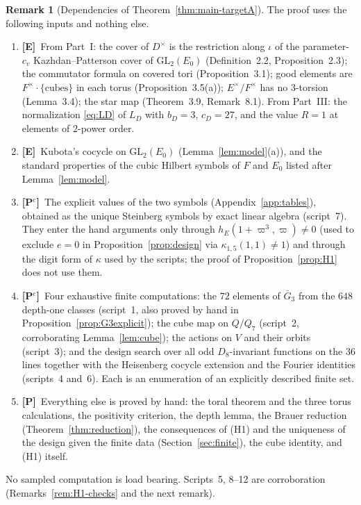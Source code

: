 \documentclass[11pt]{article}
\newcommand{\Ptag}{\textnormal{\textbf{[P]}}}
\newcommand{\Pctag}{\textnormal{\textbf{[P$^{\mathrm c}$]}}}
\newcommand{\Etag}{\textnormal{\textbf{[E]}}}
\theoremstyle{plain}
\theoremstyle{definition}
\newtheorem{remark}[theorem]{Remark}
\begin{document}
\begin{remark}[Dependencies of Theorem~\ref{thm:main-targetA}]\label{rem:dependencies}
The proof uses the following inputs and nothing else.
\begin{enumerate}[label=(D\arabic*),leftmargin=*]
\item \Etag\ From Part~I: the cover of $D^\times$ is the restriction
along $\iota$ of the parameter-$c_v$ Kazhdan--Patterson cover of
$\mathrm{GL}_2(E_0)$ (Definition~2.2, Proposition~2.3); the commutator
formula on covered tori (Proposition~3.1); good elements are
$F^\times\cdot\{\text{cubes}\}$ in each torus (Proposition~3.5(a));
$E^\times/F^\times$ has no $3$-torsion (Lemma~3.4); the star map
(Theorem~3.9, Remark~8.1).  From Part~III: the normalization
\eqref{eq:LD} of $L_D$ with $b_D=3$, $c_D=27$, and the value $R=1$ at
elements of $2$-power order.
\item \Etag\ Kubota's cocycle on $\mathrm{GL}_2(E_0)$
(Lemma~\ref{lem:model}(a)), and the standard properties of the cubic
Hilbert symbols of $F$ and $E_0$ listed after Lemma~\ref{lem:model}.
\item \Pctag\ The explicit values of the two symbols
(Appendix~\ref{app:tables}), obtained as the unique Steinberg symbols
by exact linear algebra (script~7).  They enter the hand arguments only
through $h_E(1+\varpi^3,\varpi)\ne0$ (used to exclude $e=0$ in
Proposition~\ref{prop:design} via $\kappa_{1,5}(1,1)\ne1$) and through
the digit form of $\kappa$ used by the scripts; the proof of
Proposition~\ref{prop:H1} does not use them.
\item \Pctag\ Four exhaustive finite computations: the $72$ elements of
$\bar G_3$ from the $648$ depth-one classes (script~1, also proved by
hand in Proposition~\ref{prop:G3explicit}); the cube map on $Q/Q_7$
(script~2, corroborating Lemma~\ref{lem:cube}); the actions on $V$ and
their orbits (script~3); and the design search over all odd
$D_8$-invariant functions on the $36$ lines together with the
Heisenberg cocycle extension and the Fourier identities (scripts~4
and~6).  Each is an enumeration of an explicitly described finite set.
\item \Ptag\ Everything else is proved by hand: the toral theorem and
the three torus calculations, the positivity criterion, the depth
lemma, the Brauer reduction (Theorem~\ref{thm:reduction}), the
consequences of (H1) and the uniqueness of the design given the finite
data (Section~\ref{sec:finite}), the cube identity, and (H1) itself.
\end{enumerate}
No sampled computation is load bearing.  Scripts~5, 8--12 are
corroboration (Remarks~\ref{rem:H1-checks} and the next remark).
\end{remark}
\end{document}
